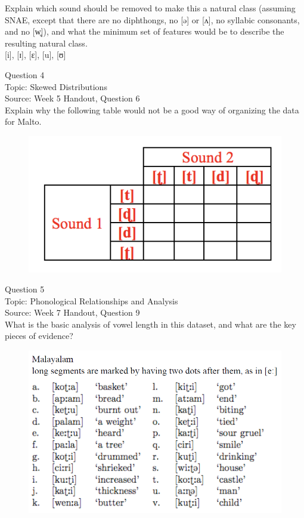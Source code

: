 \documentclass[12pt]{article}
\begin{document}
Explain which sound should be removed to make this a natural class (assuming SNAE, except that there are no diphthongs, no [ə] or [ʌ], no syllabic consonants, and no [w̥]), and what the minimum set of features would be to describe the resulting natural class.\\

{[i]}, {[ɪ]}, {[ɛ]}, {[u]}, {[ʊ]}


\newpage

{\large Question 4}\\

Topic: Skewed Distributions\\
Source: Week 5 Handout, Question 6\\

Explain why the following table would not be a good way of organizing the data for Malto.\\

\begin{figure}[H]
\includegraphics{../images/Malto_table_bad.png}
\end{figure}

\newpage

{\large Question 5}\\

Topic: Phonological Relationships and Analysis\\
Source: Week 7 Handout, Question 9\\

What is the basic analysis of vowel length in this dataset, and what are the key pieces of evidence?\\

\begin{figure}[H]
\includegraphics{../images/malayalam.png}
\end{figure}
\end{document}
